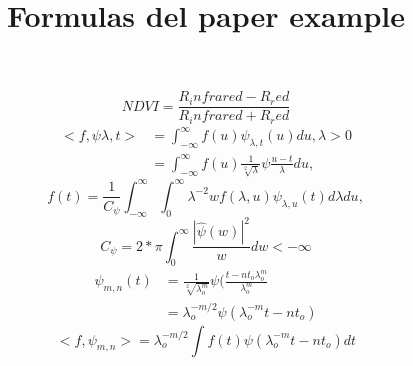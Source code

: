 \documentclass{article}
\begin{document}
\title{Formulas del paper example}
\maketitle
\begin{equation}
NDVI=\frac{R_infrared-R_red}{R_infrared+R_red}
\end{equation}
\begin{align}
<f,\psi\lambda,t>&=\int_{-\infty}^{\infty} f(u)\psi_{\lambda,t}(u)du,  \lambda>0\\
&=\int_{-\infty}^{\infty} f(u)\frac{1}{\sqrt[2]{\lambda}}\psi\frac{u-t}{\lambda}du,
\end{align}
\begin{equation}
f(t)=\frac{1}{C_\psi}\int_{-\infty}^{\infty}\int_{0}^{\infty} \lambda^{-2}wf(\lambda,u)\psi_{\lambda,u}(t)d\lambda du,
\end{equation}
\begin{equation}
C_\psi=2*\pi\int_{0}^{\infty}\frac{|\hat{\psi}(w)|^2}{w}dw <{-\infty}
\end{equation}
\begin{align}
\psi_{m,n}(t)&=\frac{1}{\sqrt[2]{\lambda_{o}^{m}}}\psi(\frac{t-nt_{o}\lambda_{o}^{m}}{\lambda_{o}^{m}}\\
&=\lambda_{o}^{-m/2}\psi(\lambda_{o}^{-m}t-nt_{o})
\end{align}
\begin{equation}
<f,\psi_{m,n}>=\lambda_{o}^{-m/2}\int f(t)\psi(\lambda_{o}^{-m}t-nt_{o})dt
\end{equation}
\end{document}
